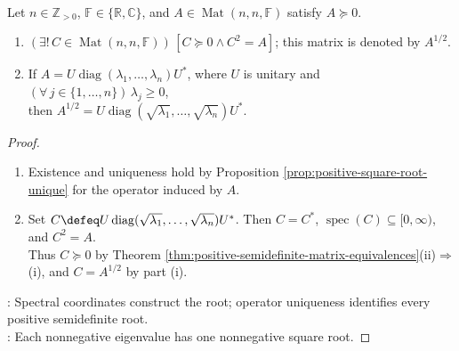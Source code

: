 \begin{corollary} \label{cor:positive-semidefinite-square-root-formula} \\
Let $n\in\mathbb{Z}_{>0}$, $\mathbb{F}\in\{\mathbb{R},\mathbb{C}\}$, and $A\in\operatorname{Mat}(n,n,\mathbb{F})$ satisfy $A\succeq0$.
\begin{enumerate}[label=(\roman*)]
\setlength{\itemsep}{0pt}
\item $(\exists!\,C\in\operatorname{Mat}(n,n,\mathbb{F}))\,[C\succeq0\land C^2=A]$; this matrix is denoted by $A^{1/2}$.
\item If $A=U\operatorname{diag}(\lambda_1,\ldots,\lambda_n)U^*$, where $U$ is unitary and $(\forall\,j\in\{1,\ldots,n\})\,\lambda_j\geq0$,\\
then $A^{1/2}=U\operatorname{diag}(\sqrt{\lambda_1},\ldots,\sqrt{\lambda_n})U^*$.
\end{enumerate}
\begin{proof}
\begin{enumerate}[label=(\roman*)]
\setlength{\itemsep}{0pt}
\item Existence and uniqueness hold by Proposition \ref{prop:positive-square-root-unique} for the operator induced by $A$.
\item Set $C\defeq U\operatorname{diag}(\sqrt{\lambda_1},\ldots,\sqrt{\lambda_n})U^*$. Then $C=C^*$, $\operatorname{spec}(C)\subseteq[0,\infty)$, and $C^2=A$.\\
Thus $C\succeq0$ by Theorem \ref{thm:positive-semidefinite-matrix-equivalences}(ii)$\Rightarrow$(i), and $C=A^{1/2}$ by part (i).
\end{enumerate}
: Spectral coordinates construct the root; operator uniqueness identifies every positive semidefinite root.\\
: Each nonnegative eigenvalue has one nonnegative square root.
\end{proof}
\end{corollary}

